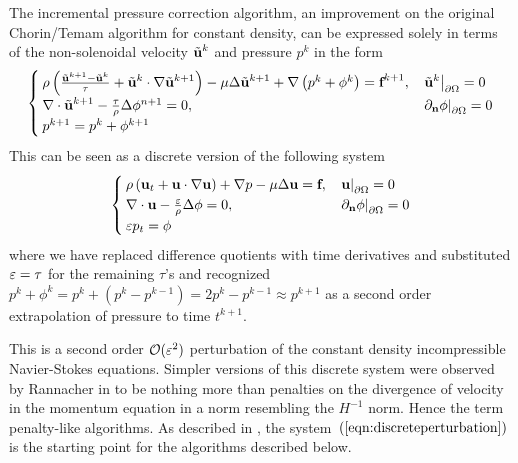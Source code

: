\documentclass[letterpaper]{erdc}
\begin{document}
The incremental pressure correction algorithm, an improvement on the original Chorin/Temam algorithm for constant density, can be expressed solely in terms of the non-solenoidal velocity $\tilde{\textbf{u}}^{k}$ and pressure $p^{k}$ in the form
\begin{equation}
  \begin{cases}
    \rho\left(\frac{\tilde{\textbf{u}}^{k+1} - \tilde{\textbf{u}}^{k}}{\tau} + \tilde{\textbf{u}}^{k}\cdot\nabla\tilde{\textbf{u}}^{k+1} \right) - \mu\Delta\tilde{\textbf{u}}^{k+1} + \nabla\left(p^{k} + \phi^{k}  \right) = \textbf{f}^{k+1}, & \left.\tilde{\textbf{u}}^{k}\right|_{\partial\Omega} = 0\\
    \nabla\cdot\tilde{\textbf{u}}^{k+1} - \frac{\tau}{\rho}\Delta\phi^{n+1}=0, &\left.\partial_{\textbf{n}} \phi\right|_{\partial\Omega} = 0\\
    p^{k+1} = p^{k} + \phi^{k+1}
  \end{cases}
\end{equation}
This can be seen as a discrete version of the following system   
\begin{equation}\label{eqn:discreteperturbation}
  \begin{cases}
    \rho\left(\textbf{u}_t + \textbf{u}\cdot\nabla\textbf{u}  \right) + \nabla p -\mu\Delta\textbf{u} = \textbf{f}, & \left.\textbf{u}\right|_{\partial\Omega} = 0\\
    \nabla\cdot\textbf{u} - \frac{\varepsilon}{\rho}\Delta \phi = 0,& \left.\partial_{\textbf{n}} \phi\right|_{\partial\Omega} = 0\\
    \varepsilon p_t = \phi
  \end{cases}
\end{equation}
where we have replaced difference quotients with time derivatives and substituted $\varepsilon = \tau$ for the remaining $\tau$'s and recognized $p^{k} + \phi^{k} = p^{k} + \left( p^{k} - p^{k-1} \right) = 2p^{k} - p^{k-1} \approx p^{k+1}$ as a second order extrapolation of pressure to time $t^{k+1}$.

This is a second order $\mathcal{O}(\varepsilon^2)$ perturbation of the constant density incompressible Navier-Stokes equations.  Simpler versions of this discrete system were observed by Rannacher in \cite{rannacher1992chorin} to be nothing more than penalties on the divergence of velocity in the momentum equation in a norm resembling the $H^{-1}$ norm.  Hence the term penalty-like algorithms.  As described in \cite{guermond2009splitting}, the system~$\left(\ref{eqn:discreteperturbation}\right)$ is the starting point for the algorithms described below.
\end{document}
